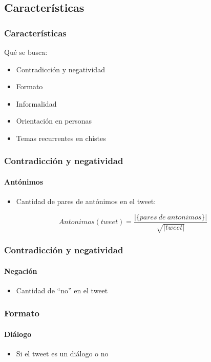 \subsection{Características}

\begin{frame}
    \frametitle{Características}

    Qué se busca:

    \begin{itemize}
        \item Contradicción y negatividad
        \item Formato
        \item Informalidad
        \item Orientación en personas
        \item Temas recurrentes en chistes
    \end{itemize}
\end{frame}

\begin{frame}
    \frametitle{Contradicción y negatividad}
    \framesubtitle{Antónimos}

    \begin{itemize}
        \item Cantidad de pares de antónimos en el tweet:
    \end{itemize}

    \begin{center}
        \[
            Antonimos(tweet) = \frac{|\{pares\ de\ antonimos\}|}{\sqrt{|tweet|}}
        \]
    \end{center}
\end{frame}

\begin{frame}
    \frametitle{Contradicción y negatividad}
    \framesubtitle{Negación}

    \begin{itemize}
        \item Cantidad de ``no'' en el tweet
    \end{itemize}
\end{frame}

\begin{frame}
    \frametitle{Formato}
    \framesubtitle{Diálogo}

    \begin{itemize}
        \item Si el tweet es un diálogo o no
    \end{itemize}
\end{frame}

